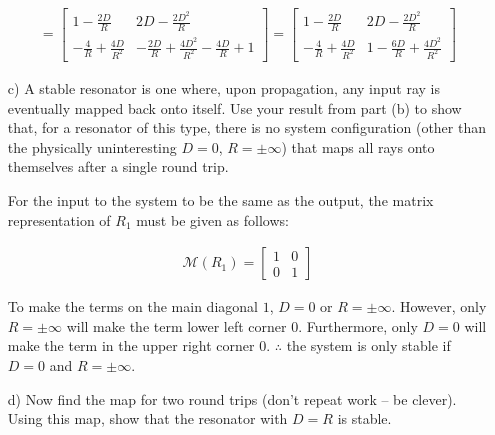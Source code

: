 \documentclass[fleqn]{article}
\begin{document}
\begin{enumerate}[nolistsep]
			\begin{align*}
				= \begin{bmatrix}1 - \frac{2D}{R} & 2D - \frac{2D^2}{R}\\ -\frac{4}{R} +\frac{4D}{R^2} & -\frac{2D}{R} + \frac{4D^2}{R^2} -\frac{4D}{R} + 1\end{bmatrix} = \begin{bmatrix}1 - \frac{2D}{R} & 2D - \frac{2D^2}{R}\\ -\frac{4}{R} + \frac{4D}{R^2} & 1 - \frac{6D}{R} + \frac{4D^2}{R^2}\end{bmatrix}
			\end{align*}
			
			\item[c)] A stable resonator is one where, upon propagation, any input ray is eventually mapped back onto itself. Use your result from part (b) to show that, for a resonator of this type, there is no system configuration (other than the physically uninteresting $D = 0$, $R = \pm \infty$) that maps all rays onto themselves after a single round trip.
			
			\pagebreak
			For the input to the system to be the same as the output, the matrix representation of $R_1$ must be given as follows:
			
			\begin{align*}
				\mathcal{M}(R_1) = \begin{bmatrix}1 & 0\\ 0 & 1\end{bmatrix}
			\end{align*}
			
			To make the terms on the main diagonal $1$, $D = 0$ or $R = \pm\infty$. However, only $R = \pm\infty$ will make the term lower left corner $0$. Furthermore, only $D = 0$ will make the term in the upper right corner $0$. $\therefore$ the system is only stable if $D=0$ and $R=\pm\infty$.			
			
			\item[d)] Now find the map for two round trips (don’t repeat work – be clever). Using this map, show that the resonator with $D = R$ is stable.
	\end{enumerate}
\end{document}
